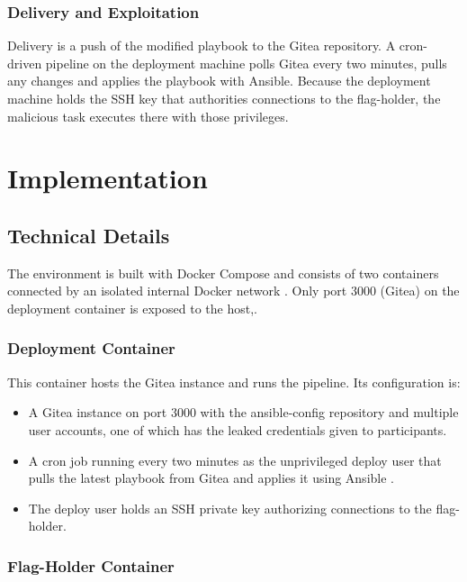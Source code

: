 \documentclass{article}
\begin{document}
\subsubsection{Delivery and Exploitation}

Delivery is a push of the modified playbook to the Gitea repository. A cron-driven pipeline on the deployment machine polls Gitea every two minutes, pulls any changes and applies the playbook with Ansible. Because the deployment machine holds the SSH key that authorities connections to the flag-holder, the malicious task executes there with those privileges.

\section{Implementation}

\subsection{Technical Details}

The environment is built with Docker Compose and consists of two containers connected by an isolated internal Docker network . Only port 3000 (Gitea) on the deployment container is exposed to the host,.

\subsubsection{Deployment Container}

This container hosts the Gitea instance \cite{giteaDocs} and runs the pipeline. Its configuration is:
\begin{itemize}
    \item A Gitea instance on port 3000 with the ansible-config repository and multiple user accounts, one of which has the leaked credentials given to participants.
    \item A cron job running every two minutes as the unprivileged deploy user that pulls the latest playbook from Gitea and applies it using Ansible \cite{ansibleDocs}.
    \item The deploy user holds an SSH private key authorizing connections to the flag-holder.
\end{itemize}

\subsubsection{Flag-Holder Container}
\end{document}
